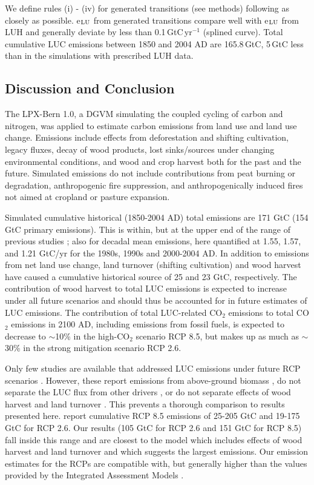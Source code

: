 We define rules (i) - (iv) for generated transitions (see methods) following \citet{hurtt06gcb} as closely as possible. e$_{\mbox{\scriptsize LU}}$ from generated transitions compare well with e$_{\mbox{\scriptsize LU}}$ from LUH and generally deviate by less than 0.1\,GtC\,yr$^{-1}$ (splined curve). Total cumulative LUC emissions between 1850 and 2004 AD are 165.8\,GtC, 5\,GtC less than in the simulations with prescribed LUH data. 

\subsection*{Discussion and Conclusion}
\label{sec:discussion}
The LPX-Bern 1.0, a DGVM simulating the coupled cycling of carbon and nitrogen, was applied to estimate carbon emissions from land use and land use change. Emissions include effects from deforestation and shifting cultivation, legacy fluxes, decay of wood products, lost sinks/sources under changing environmental conditions, and wood and crop harvest both for the past and the future. Simulated emissions do not include contributions from peat burning or degradation, anthropogenic fire suppression, and anthropogenically induced fires not aimed at cropland or pasture expansion.

Simulated cumulative historical (1850-2004 AD) total emissions are 171 GtC (154 GtC primary emissions). This is within, but at the upper end of the range of previous studies \citep{houghton12bg,lequere13essd}; also for decadal mean emissions, here quantified at 1.55, 1.57, and 1.21 GtC/yr for the 1980s, 1990s and 2000-2004 AD. In addition to emissions from net land use change, land turnover (shifting cultivation) and wood harvest have caused a cumulative historical source of 25 and 23 GtC, respectively. The contribution of wood harvest to total LUC emissions is expected to increase under all future scenarios and should thus be accounted for in future estimates of LUC emissions. The contribution of total LUC-related CO$_2$ emissions to total CO$_2$ emissions in 2100 AD, including emissions from fossil fuels, is expected to decrease to $\sim$10\% in the high-CO$_2$ scenario RCP 8.5, but makes up as much as $\sim$30\% in the strong mitigation scenario RCP 2.6.

Only few studies are available that addressed LUC emissions under future RCP scenarios \citep{hurtt11,lawrence12jclim,brovkin13jclim}. However, these report emissions from above-ground biomass \citep{hurtt11}, do not separate the LUC flux from other drivers \citep{lawrence12jclim}, or do not separate effects of wood harvest and land turnover \citep{brovkin13jclim}. This prevents a thorough comparison to results presented here. \citep{brovkin13jclim} report cumulative RCP 8.5 emissions of 25-205 GtC and 19-175 GtC for RCP 2.6. Our results (105 GtC for RCP 2.6 and 151 GtC for RCP 8.5) fall inside this range and are closest to the model which includes effects of wood harvest and land turnover and which suggests the largest emissions. Our emission estimates for the RCPs are compatible with, but generally higher than the values provided by the Integrated Assessment Models \citep{ciais13ipcc}.

